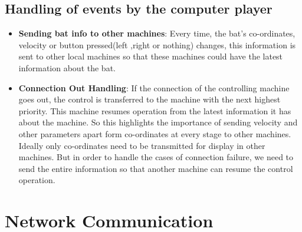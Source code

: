 \documentclass{article}
\begin{document}
\subsection{Handling of events by the computer player}
\begin{itemize}
\item \textbf{Sending bat info to other machines}: Every time, the bat's co-ordinates, velocity or button pressed(left ,right or nothing) changes, this information is sent to other local machines so that these machines could have the latest information about the bat.
\item \textbf{Connection Out Handling}: If the connection of the controlling machine goes out, the control is transferred to the machine with the next highest priority. This machine resumes operation from the latest information it has about the machine. So this highlights the importance of sending velocity and other parameters apart form co-ordinates at every stage to other machines. Ideally only co-ordinates need to be transmitted for display in other machines. But in order to handle the cases of connection failure, we need to send the entire information so that another machine can resume the control operation.
\end{itemize}
\section{Network Communication}
\end{document}
